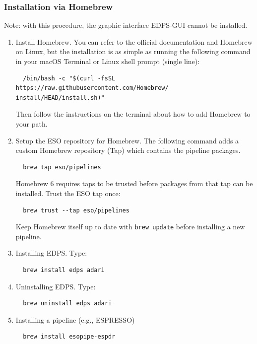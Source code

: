 \subsubsection{Installation via Homebrew}
Note: with this procedure, the graphic interface EDPS-GUI cannot be installed.

\begin{enumerate}
\item Install Homebrew. You can refer to the official documentation and Homebrew on Linux, but the installation is as simple as running the following command in your macOS Terminal or Linux shell prompt (single line):
\begin{verbatim}
  /bin/bash -c "$(curl -fsSL https://raw.githubusercontent.com/Homebrew/
install/HEAD/install.sh)"
\end{verbatim}
Then follow the instructions on the terminal about how to add Homebrew to your path.

\item Setup the ESO repository for Homebrew.
The following command adds a custom Homebrew repository (Tap) which contains the pipeline packages.

\begin{verbatim}
  brew tap eso/pipelines
\end{verbatim}

Homebrew 6 requires taps to be trusted before packages from that tap can be installed. Trust the ESO tap once:

\begin{verbatim}
  brew trust --tap eso/pipelines
\end{verbatim}

Keep Homebrew itself up to date with {\tt brew update} before installing a new pipeline.

\item Installing EDPS. Type:

\begin{verbatim}
  brew install edps adari
\end{verbatim}
\item Uninstalling EDPS. Type:
  \begin{verbatim}
  brew uninstall edps adari
\end{verbatim}

\item Installing a pipeline (e.g., ESPRESSO)

\begin{verbatim}
  brew install esopipe-espdr
\end{verbatim}
\end{enumerate}

